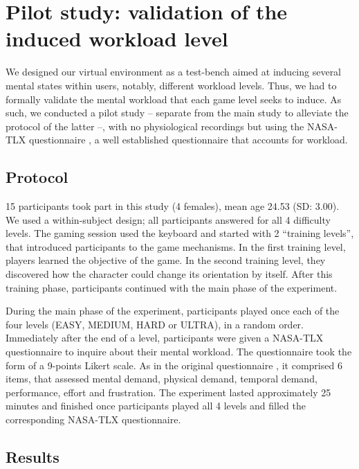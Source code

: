 \documentclass[]{sigchi}
\begin{document}
\section{Pilot study: validation of the induced workload
level}\label{pilot-study-validation-of-the-induced-workload-level}

We designed our virtual environment as a test-bench aimed at inducing
several mental states within users, notably, different workload levels.
Thus, we had to formally validate the mental workload that each game
level seeks to induce. As such, we conducted a pilot study -- separate
from the main study to alleviate the protocol of the latter --, with no
physiological recordings but using the NASA-TLX questionnaire
\citep{Hart1988}, a well established questionnaire that accounts for
workload.

\subsection{Protocol}\label{protocol}

15 participants took part in this study (4 females), mean age 24.53 (SD:
3.00). We used a within-subject design; all participants answered for
all 4 difficulty levels. The gaming session used the keyboard and
started with 2 ``training levels'', that introduced participants to the
game mechanisms. In the first training level, players learned the
objective of the game. In the second training level, they discovered how
the character could change its orientation by itself. After this
training phase, participants continued with the main phase of the
experiment.

During the main phase of the experiment, participants played once each
of the four levels (EASY, MEDIUM, HARD or ULTRA), in a random order.
Immediately after the end of a level, participants were given a NASA-TLX
questionnaire to inquire about their mental workload. The questionnaire
took the form of a 9-points Likert scale. As in the original
questionnaire \citep{Hart1988}, it comprised 6 items, that assessed
mental demand, physical demand, temporal demand, performance, effort and
frustration. The experiment lasted approximately 25 minutes and finished
once participants played all 4 levels and filled the corresponding
NASA-TLX questionnaire.

\subsection{Results}\label{results}
\end{document}
